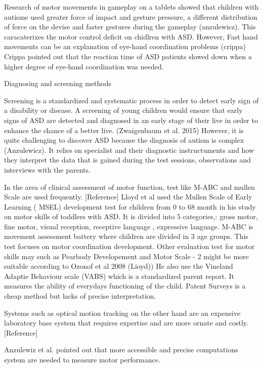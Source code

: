 Research of motor movements in gameplay on a tablets showed that children with autisme used greater force of impact and gesture pressure, a different distribution of force on the devise and faster gestures during the gameplay (anzulewicz). This caracaterixes the motor control deficit on chidlren with ASD. However,  Fast hand movements can be an explanation of eye-hand coordination problems (crippa) Crippa pointed out that the reaction time of ASD patients slowed down  when a higher degree of eye-hand coordination was needed.




Diagnosing and screening methods

Screening is a standardized and systematic process in order to detect early sign of a disability or disease. A screening of young children would ensure that early signs of ASD are detected and diagnosed in an early stage of their live in order to enhance the chance of a better live. (Zwaigenbaum et al. 2015)  
However, it is quite challenging to discover ASD because the diagnosis of autism is complex (Anzulewicz). It relies on specialist and their diagnostic instructuments and how they interpret the data that is gained during the test sessions, observations and interviews with the parents.




In the area of clinical assessment of motor function, test like M-ABC and mullen Scale are used frequently. [Reference]
Lloyd et al used the Mullen Scale of Early Learning ( MSEL) development test for children from 0 to 68 month in his study on motor skills of toddlers with ASD. It is divided into 5 categories,: gross motor, fine motor, visual reception,  receptive language , expressive language.
M-ABC is movement assessment battery where children are divided in 3 age groups. This test focuses on  motor coordination development.  
Other evaluation test for  motor skills may such as  Pearbody Developement and Motor Scale - 2 might be more suitable according to Ozonof et al 2008 (Lioyd))
He also use the Vineland Adaptie Behaviour scale (VABS) which is a standardized parent report. It measures the ability of everydays functioning of the child. Patent Surveys is a cheap method but lacks of precise interpretation.

Systems such as optical motion tracking on the other hand  are an expensive laboratory base system that requires expertise and are more ornate and costly. [Reference]

Anzulewiz et al. pointed out that more accessible and precise computations  system are needed to measure motor performance.


